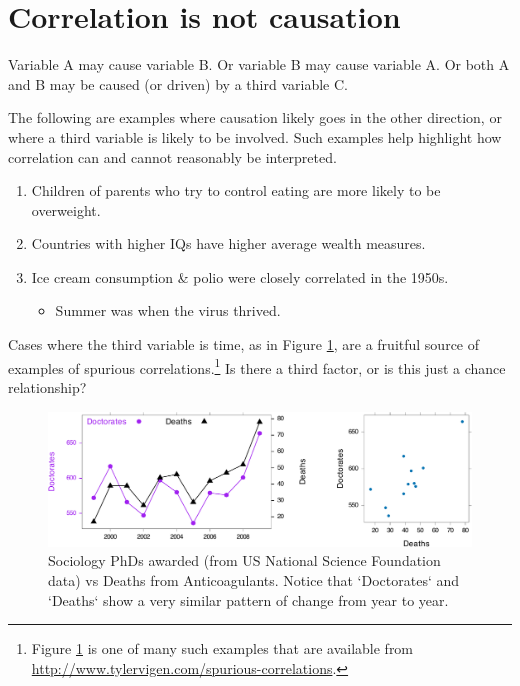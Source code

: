 \documentclass[
  10pt,
  b5paper]{book}
\providecommand{\tightlist}{%
  \setlength{\itemsep}{0pt}\setlength{\parskip}{0pt}}
\begin{document}
\hypertarget{correlation-is-not-causation}{%
\section{Correlation is not causation}\label{correlation-is-not-causation}}

Variable A may cause variable B. Or variable B may cause
variable A. Or both A and B may be caused (or driven) by
a third variable C.

The following are examples where causation likely goes in the other
direction, or where a third variable is likely to be involved.
Such examples help highlight how correlation can and cannot
reasonably be interpreted.

\begin{enumerate}
\def\labelenumi{\arabic{enumi}.}
\tightlist
\item
  Children of parents who try to control eating are more likely
  to be overweight.
\item
  Countries with higher IQs have higher average wealth measures.
\item
  Ice cream consumption \& polio were closely correlated in the 1950s.

  \begin{itemize}
  \tightlist
  \item
    Summer was when the virus thrived.
  \end{itemize}
\end{enumerate}

Cases where the third variable is
time, as in Figure \ref{fig:socAnti}, are a fruitful source
of examples of spurious correlations.\footnote{Figure \ref{fig:socAnti}
  is one of many such examples that are available from\\
  \url{http://www.tylervigen.com/spurious-correlations}.}
Is there a third factor, or is this just a chance relationship?

\begin{figure}

{\centering \includegraphics[width=1\linewidth]{07-regress_files/figure-latex/socAnti-1} 

}

\caption{Sociology PhDs awarded (from US National Science 
Foundation data) vs Deaths from Anticoagulants.  Notice
that `Doctorates` and `Deaths` show a very similar pattern
of change from year to year.
}\label{fig:socAnti}
\end{figure}
\end{document}
